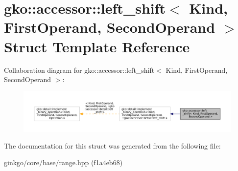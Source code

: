\hypertarget{structgko_1_1accessor_1_1left__shift}{}\section{gko\+:\+:accessor\+:\+:left\+\_\+shift$<$ Kind, First\+Operand, Second\+Operand $>$ Struct Template Reference}
\label{structgko_1_1accessor_1_1left__shift}


Collaboration diagram for gko\+:\+:accessor\+:\+:left\+\_\+shift$<$ Kind, First\+Operand, Second\+Operand $>$\+:
\nopagebreak
\begin{figure}[H]
\begin{center}
\leavevmode
\includegraphics[width=350pt]{structgko_1_1accessor_1_1left__shift__coll__graph}
\end{center}
\end{figure}


The documentation for this struct was generated from the following file\+:\begin{DoxyCompactItemize}
\item 
ginkgo/core/base/range.\+hpp (f1a4eb68)\end{DoxyCompactItemize}
